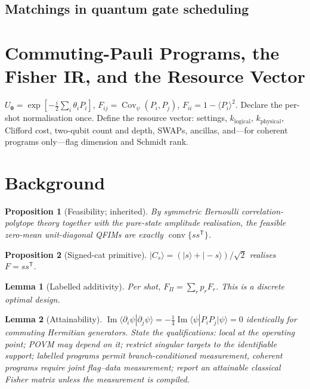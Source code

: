 \documentclass[11pt]{article}
\newtheorem{proposition}{Proposition}
\newtheorem{lemma}{Lemma}
\begin{document}
\subsection{Matchings in quantum gate scheduling}

\section{Commuting-Pauli Programs, the Fisher IR, and the Resource Vector}
$U_{\bm\theta}=\exp[-\tfrac i2\sum_i\theta_iP_i]$, $F_{ij}=\operatorname{Cov}_\psi(P_i,P_j)$,
$F_{ii}=1-\langle P_i\rangle^2$. Declare the per-shot normalisation once. Define the resource
vector: settings, $k_{\mathrm{logical}}$, $k_{\mathrm{physical}}$, Clifford cost, two-qubit
count and depth, SWAPs, ancillas, and---for coherent programs only---flag dimension and
Schmidt rank.

\section{Background}
\begin{proposition}[Feasibility; inherited]
By symmetric Bernoulli correlation-polytope theory together with the pure-state amplitude
realisation, the feasible zero-mean unit-diagonal QFIMs are exactly
$\operatorname{conv}\{ss^{\mathsf T}\}$.
\end{proposition}
\begin{proposition}[Signed-cat primitive]
$|C_s\rangle=(|s\rangle+|-s\rangle)/\sqrt2$ realises $F=ss^{\mathsf T}$.
\end{proposition}
\begin{lemma}[Labelled additivity]
Per shot, $F_\Pi=\sum_rp_rF_r$. This is a discrete optimal design.
\end{lemma}
\begin{lemma}[Attainability]
$\operatorname{Im}\langle\partial_i\psi|\partial_j\psi\rangle
=-\tfrac14\operatorname{Im}\langle\psi|P_iP_j|\psi\rangle=0$ identically for commuting
Hermitian generators. State the qualifications: local at the operating point; POVM may depend
on it; restrict singular targets to the identifiable support; labelled programs permit
branch-conditioned measurement, coherent programs require joint flag--data measurement;
report an attainable classical Fisher matrix unless the measurement is compiled.
\end{lemma}
\end{document}
